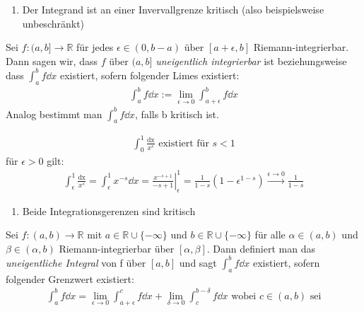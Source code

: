\begin{enumerate}[resume]
	\item Der Integrand ist an einer Invervallgrenze kritisch (also beispielsweise 
	unbeschränkt)
\end{enumerate}

\begin{Definition}{
	Sei $f: (a, b] \rightarrow \mathbb{R}$ für jedes $ \epsilon \in (0, b-a)$ 
	über $[a + \epsilon, b]$ Riemann-integrierbar. Dann sagen wir, dass $f$ 
	über $(a,b]$ \emph{uneigentlich integrierbar} ist beziehungsweise dass 
	$\int_a^b f \dd{x}$ existiert, sofern folgender Limes existiert:
	\begin{align*}
		\int_a^b f \dd{x} := \lim\limits_{\epsilon \rightarrow 0}
		{\int_{a + \epsilon}^b f \dd{x}}
	\end{align*}
	Analog bestimmt man $\int_a^b f \dd{x}$, falls b kritisch ist.
}\end{Definition}

\begin{Beispiel}{\label{vl_13_bsp_2}
	\begin{align*}
		\int_0^1 \frac{\mathrm{dx}}{x^s} \text{ existiert für } s < 1
	\end{align*}
	für $\epsilon > 0$ gilt:
	\begin{align*}
		\int_{\epsilon}^1 \frac{\mathrm{dx}}{x^s} = \int_{\epsilon}^1 x^{-s} \dd{x} 
		= \left. \frac{x^{-s+1}}{-s+1} \right\vert_{\epsilon}^1 
		= \frac{1}{1-s} (1- \epsilon^{1-s}) \overset{\epsilon \rightarrow 0}
		{\rightarrow}\frac{1}{1-s}
	\end{align*}
}\end{Beispiel}


\begin{enumerate}[resume]
	\item Beide Integrationsgerenzen sind kritisch
\end{enumerate}

\begin{Definition}{
	Sei $f:(a,b) \rightarrow \mathbb{R}$ mit $a \in \mathbb{R} \cup \{- \infty\}$ 
	und $b \in \mathbb{R} \cup \{-\infty\}$ für alle $\alpha \in (a,b)$ und 
	$\beta \in (\alpha, b)$ Riemann-integrierbar über $[\alpha, \beta]$.
	Dann definiert man das \emph{uneigentliche Integral} von f über $[a,b]$ und 
	sagt $\int_a^b f \dd{x}$ existiert, sofern folgender Grenzwert existiert:
	\begin{align*}
		\int_a^b f \dd{x} = \lim\limits_{\epsilon \rightarrow 0}{\int_{a + \epsilon}
		^c f \dd{x}} + \lim\limits_{\delta \rightarrow 0}{\int_c ^{b - \delta} f 
		\dd{x}} \text{ wobei } c \in (a,b) \text{ sei}
	\end{align*}
}\end{Definition}


